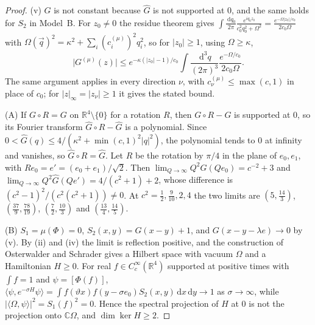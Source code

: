 \documentclass[11pt,a4paper]{amsart}
\theoremstyle{definition}
\theoremstyle{remark}
\numberwithin{equation}{section}
\newcommand{\R}{\mathbb{R}}          %
\newcommand{\C}{\mathbb{C}}          %
\newcommand{\ip}[2]{\langle #1,#2\rangle}  %
\newcommand{\abs}[1]{\lvert #1\rvert}      %
\newcommand{\dd}{\,\mathrm{d}}             %
\begin{document}
\begin{proof}
(v) $G$ is not constant because $\hat G$ is not supported at $0$, and the same holds for $S_2$ in Model~B. For $z_0\ne0$ the residue theorem gives $\int\frac{\dd q_0}{2\pi}\frac{e^{iq_0z_0}}{c_0^2q_0^2+\Omega^2}=\frac{e^{-\Omega\abs{z_0}/c_0}}{2c_0\Omega}$ with $\Omega(\vec q)^2=\kappa^2+\sum_i(c^{(\mu)}_i)^2q_i^2$, so for $\abs{z_0}\ge1$, using $\Omega\ge\kappa$,
\[
\abs{G^{(\mu)}(z)}\le e^{-\kappa(\abs{z_0}-1)/c_0}\int\frac{\dd^3q}{(2\pi)^3}\frac{e^{-\Omega/c_0}}{2c_0\Omega}.
\]
The same argument applies in every direction $\nu$, with $c^{(\mu)}_\nu\le\max(c,1)$ in place of $c_0$; for $\abs z_\infty=\abs{z_\nu}\ge1$ it gives the stated bound.

(A) If $G\circ R=G$ on $\R^4\setminus\{0\}$ for a rotation $R$, then $G\circ R-G$ is supported at $0$, so its Fourier transform $\hat G\circ R-\hat G$ is a polynomial. Since $0<\hat G(q)\le4/(\kappa^2+\min(c,1)^2\abs q^2)$, the polynomial tends to $0$ at infinity and vanishes, so $\hat G\circ R=\hat G$. Let $R$ be the rotation by $\pi/4$ in the plane of $e_0,e_1$, with $Re_0=e'=(e_0+e_1)/\sqrt2$. Then $\lim_{Q\to\infty}Q^2\hat G(Qe_0)=c^{-2}+3$ and $\lim_{Q\to\infty}Q^2\hat G(Qe')=4/(c^2+1)+2$, whose difference is $(c^2-1)^2/(c^2(c^2+1))\ne0$. At $c^2=\frac12,\frac9{10},2,4$ the two limits are $(5,\frac{14}3)$, $(\frac{37}9,\frac{78}{19})$, $(\frac72,\frac{10}3)$ and $(\frac{13}4,\frac{14}5)$.

(B) $S_1=\mu(\Phi)=0$, $S_2(x,y)=G(x-y)+1$, and $G(x-y-\lambda e)\to0$ by (v). By (ii) and (iv) the limit is reflection positive, and the construction of Osterwalder and Schrader \cite{osterwalder1973} gives a Hilbert space with vacuum $\Omega$ and a Hamiltonian $H\ge0$. For real $f\in C^\infty_c(\R^4)$ supported at positive times with $\int f=1$ and $\psi=[\Phi(f)]$, $\ip{\psi}{e^{-\sigma H}\psi}=\int f(\vartheta x)f(y-\sigma e_0)S_2(x,y)\dd x\dd y\to1$ as $\sigma\to\infty$, while $\abs{\ip\Omega\psi}^2=S_1(f)^2=0$. Hence the spectral projection of $H$ at $0$ is not the projection onto $\C\Omega$, and $\dim\ker H\ge2$.
\end{proof}
\end{document}
